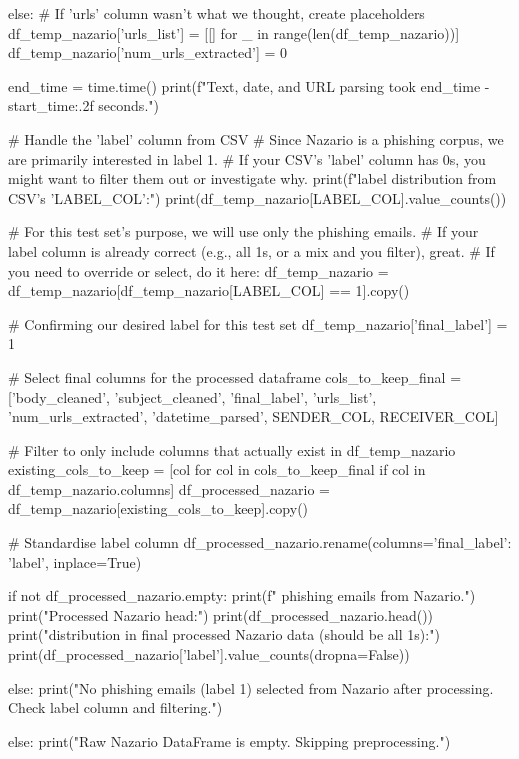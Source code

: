\begin{ffcode}
    else: # If 'urls' column wasn't what we thought, create placeholders
        df_temp_nazario['urls_list'] = [[] for _ in range(len(df_temp_nazario))]
        df_temp_nazario['num_urls_extracted'] = 0

    end_time = time.time()
    print(f"Text, date, and URL parsing took {end_time - start_time:.2f} seconds.")

    # Handle the 'label' column from CSV
    # Since Nazario is a phishing corpus, we are primarily interested in label 1.
    # If your CSV's 'label' column has 0s, you might want to filter them out or investigate why.
    print(f"\nOriginal label distribution from CSV's '{LABEL_COL}':")
    print(df_temp_nazario[LABEL_COL].value_counts())

    # For this test set's purpose, we will use only the phishing emails.
    # If your label column is already correct (e.g., all 1s, or a mix and you filter), great.
    # If you need to override or select, do it here:
    df_temp_nazario = df_temp_nazario[df_temp_nazario[LABEL_COL] == 1].copy()

    # Confirming our desired label for this test set
    df_temp_nazario['final_label'] = 1

    # Select final columns for the processed dataframe
    cols_to_keep_final = ['body_cleaned', 'subject_cleaned', 'final_label', 'urls_list', 'num_urls_extracted', 'datetime_parsed', SENDER_COL, RECEIVER_COL]

    # Filter to only include columns that actually exist in df_temp_nazario
    existing_cols_to_keep = [col for col in cols_to_keep_final if col in df_temp_nazario.columns]
    df_processed_nazario = df_temp_nazario[existing_cols_to_keep].copy()

    # Standardise label column
    df_processed_nazario.rename(columns={'final_label': 'label'}, inplace=True)

    if not df_processed_nazario.empty:
        print(f" phishing emails from Nazario.")
        print("Processed Nazario head:")
        print(df_processed_nazario.head())
        print("\nLabel distribution in final processed Nazario data (should be all 1s):")
        print(df_processed_nazario['label'].value_counts(dropna=False))

    else:
        print("No phishing emails (label 1) selected from Nazario after processing. Check label column and filtering.")

else:
    print("Raw Nazario DataFrame is empty. Skipping preprocessing.")


\end{ffcode}

